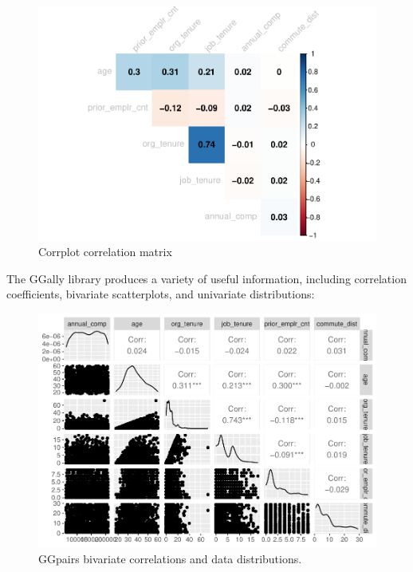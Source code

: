 \documentclass[
]{book}
\begin{document}
\begin{figure}

{\centering \includegraphics[width=1\linewidth]{People_Analytics_Lifecycle_files/figure-latex/corrplot-comp-1} 

}

\caption{Corrplot correlation matrix}\label{fig:corrplot-comp}
\end{figure}

The GGally library produces a variety of useful information, including correlation coefficients, bivariate scatterplots, and univariate distributions:

\begin{figure}

{\centering \includegraphics[width=1\linewidth]{People_Analytics_Lifecycle_files/figure-latex/ggpairs-comp-1} 

}

\caption{GGpairs bivariate correlations and data distributions.}\label{fig:ggpairs-comp}
\end{figure}
\end{document}
